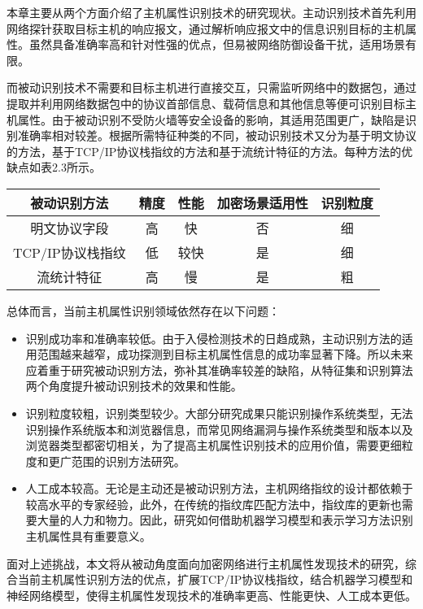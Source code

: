 本章主要从两个方面介绍了主机属性识别技术的研究现状。主动识别技术首先利用网络探针获取目标主机的响应报文，通过解析响应报文中的信息识别目标的主机属性。虽然具备准确率高和针对性强的优点，但易被网络防御设备干扰，适用场景有限。

而被动识别技术不需要和目标主机进行直接交互，只需监听网络中的数据包，通过提取并利用网络数据包中的协议首部信息、载荷信息和其他信息等便可识别目标主机属性。由于被动识别不受防火墙等安全设备的影响，其适用范围更广，缺陷是识别准确率相对较差。根据所需特征种类的不同，被动识别技术又分为基于明文协议的方法，基于TCP/IP协议栈指纹的方法和基于流统计特征的方法。每种方法的优缺点如表2.3所示。

\begin{table}[!htbp] 
    \centering
    \footnotesize
    \setlength{\tabcolsep}{15pt}
    \renewcommand{\arraystretch}{1.2}
\begin{tabular}{ccccc}
\toprule
被动识别方法 & 精度 & 性能 & 加密场景适用性 & 识别粒度\\ \hline
明文协议字段 & 高 & 快 & 否 & 细 \\ 
TCP/IP协议栈指纹 & 低 & 较快 & 是 & 细 \\ 
流统计特征 & 高 & 慢 & 是 & 粗 \\ 
\bottomrule
\end{tabular}
\end{table}

总体而言，当前主机属性识别领域依然存在以下问题：

\begin{itemize}

\item 识别成功率和准确率较低。由于入侵检测技术的日趋成熟，主动识别方法的适用范围越来越窄，成功探测到目标主机属性信息的成功率显著下降。所以未来应着重于研究被动识别方法，弥补其准确率较差的缺陷，从特征集和识别算法两个角度提升被动识别技术的效果和性能。

\item 识别粒度较粗，识别类型较少。大部分研究成果只能识别操作系统类型，无法识别操作系统版本和浏览器信息，而常见网络漏洞与操作系统类型和版本以及浏览器类型都密切相关，为了提高主机属性识别技术的应用价值，需要更细粒度和更广范围的识别方法研究。

\item 人工成本较高。无论是主动还是被动识别方法，主机网络指纹的设计都依赖于较高水平的专家经验，此外，在传统的指纹库匹配方法中，指纹库的更新也需要大量的人力和物力。因此，研究如何借助机器学习模型和表示学习方法识别主机属性具有重要意义。
\end{itemize}

面对上述挑战，本文将从被动角度面向加密网络进行主机属性发现技术的研究，综合当前主机属性识别方法的优点，扩展TCP/IP协议栈指纹，结合机器学习模型和神经网络模型，使得主机属性发现技术的准确率更高、性能更快、人工成本更低。

